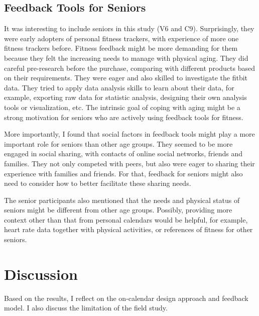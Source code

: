 \documentclass[12pt,oneside]{book}
\begin{document}
\subsection{Feedback Tools for Seniors}
It was interesting to include seniors in this study (V6 and C9). Surprisingly, they were early adopters of personal fitness trackers, with experience of more one fitness trackers before. Fitness feedback might be more demanding for them because they felt the increasing needs to manage with physical aging. They did careful pre-research before the purchase, comparing with different products based on their requirements. They were eager and also skilled to investigate the fitbit data. They tried to apply data analysis skills to learn about their data, for example, exporting raw data for statistic analysis, designing their own analysis tools or visualization, etc. The intrinsic goal of coping with aging might be a strong motivation for seniors who are actively using feedback tools for fitness.

More importantly, I found that social factors in feedback tools might play a more important role for seniors than other age groups. They seemed to be more engaged in social sharing, with contacts of online social networks, friends and families. They not only competed with peers, but also were eager to sharing their experience with families and friends. For that, feedback for seniors might also need to consider how to better facilitate these sharing needs.

The senior participants also mentioned that the needs and physical status of seniors might be different from other age groups. Possibly, providing more context other than that from personal calendars would be helpful, for example, heart rate data together with physical activities, or references of fitness for other seniors.



\section{Discussion}
\label{section:discussion}
Based on the results, I reflect on the on-calendar design approach and feedback model. I also discuss the limitation of the field study.
\end{document}
